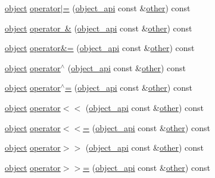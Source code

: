 \begin{DoxyCompactItemize}
\item 
\mbox{\hyperlink{classobject}{object}} \mbox{\hyperlink{classobject__api_a625aa25cf930253e2e731349b91d8048}{operator$\vert$=}} (\mbox{\hyperlink{classobject__api}{object\+\_\+api}} const \&\mbox{\hyperlink{dictobject_8h_abd4733e17e86acb453bda62bc8b96adf}{other}}) const
\item 
\mbox{\hyperlink{classobject}{object}} \mbox{\hyperlink{classobject__api_a9c05418ebf1a3bb27c981a3738212264}{operator \&}} (\mbox{\hyperlink{classobject__api}{object\+\_\+api}} const \&\mbox{\hyperlink{dictobject_8h_abd4733e17e86acb453bda62bc8b96adf}{other}}) const
\item 
\mbox{\hyperlink{classobject}{object}} \mbox{\hyperlink{classobject__api_ac5a561b5ef0c8518d5c1f0e98185fb3e}{operator\&=}} (\mbox{\hyperlink{classobject__api}{object\+\_\+api}} const \&\mbox{\hyperlink{dictobject_8h_abd4733e17e86acb453bda62bc8b96adf}{other}}) const
\item 
\mbox{\hyperlink{classobject}{object}} \mbox{\hyperlink{classobject__api_acc1fc225681c932e6f3579bf43ef1e47}{operator$^\wedge$}} (\mbox{\hyperlink{classobject__api}{object\+\_\+api}} const \&\mbox{\hyperlink{dictobject_8h_abd4733e17e86acb453bda62bc8b96adf}{other}}) const
\item 
\mbox{\hyperlink{classobject}{object}} \mbox{\hyperlink{classobject__api_aa0287f61e2ec9962bead679f640c62ea}{operator$^\wedge$=}} (\mbox{\hyperlink{classobject__api}{object\+\_\+api}} const \&\mbox{\hyperlink{dictobject_8h_abd4733e17e86acb453bda62bc8b96adf}{other}}) const
\item 
\mbox{\hyperlink{classobject}{object}} \mbox{\hyperlink{classobject__api_a497229c4f1c3842eba6ceeddbfb5dca7}{operator$<$$<$}} (\mbox{\hyperlink{classobject__api}{object\+\_\+api}} const \&\mbox{\hyperlink{dictobject_8h_abd4733e17e86acb453bda62bc8b96adf}{other}}) const
\item 
\mbox{\hyperlink{classobject}{object}} \mbox{\hyperlink{classobject__api_a68ca4903ae971465b87c148e9e4a4bed}{operator$<$$<$=}} (\mbox{\hyperlink{classobject__api}{object\+\_\+api}} const \&\mbox{\hyperlink{dictobject_8h_abd4733e17e86acb453bda62bc8b96adf}{other}}) const
\item 
\mbox{\hyperlink{classobject}{object}} \mbox{\hyperlink{classobject__api_a1c874cdc51a00badff0938afca076365}{operator$>$$>$}} (\mbox{\hyperlink{classobject__api}{object\+\_\+api}} const \&\mbox{\hyperlink{dictobject_8h_abd4733e17e86acb453bda62bc8b96adf}{other}}) const
\item 
\mbox{\hyperlink{classobject}{object}} \mbox{\hyperlink{classobject__api_abcee9a0ac25d249d8ae6d17a5747ee2f}{operator$>$$>$=}} (\mbox{\hyperlink{classobject__api}{object\+\_\+api}} const \&\mbox{\hyperlink{dictobject_8h_abd4733e17e86acb453bda62bc8b96adf}{other}}) const

\end{DoxyCompactItemize}
